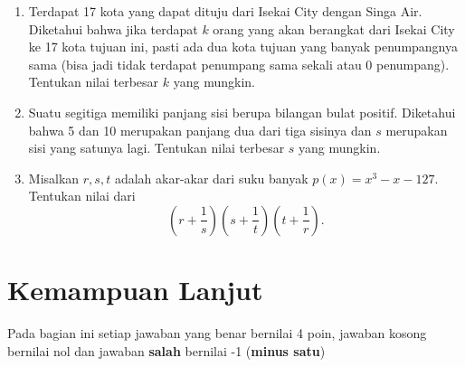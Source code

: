\documentclass[12pt]{scrartcl}
\begin{document}
\begin{enumerate}
		\item Terdapat 17 kota yang dapat dituju dari Isekai City dengan Singa Air. Diketahui bahwa jika terdapat $k$ orang yang akan berangkat dari Isekai City ke 17 kota tujuan ini, pasti ada dua kota tujuan yang banyak penumpangnya sama (bisa jadi tidak terdapat penumpang sama sekali atau 0 penumpang). Tentukan nilai terbesar $k$ yang mungkin.
		
		\item Suatu segitiga memiliki panjang sisi berupa bilangan bulat positif. Diketahui bahwa 5 dan 10 merupakan panjang dua dari tiga sisinya dan $s$ merupakan sisi yang satunya lagi. Tentukan nilai terbesar $s$ yang mungkin.
		
		\item Misalkan $r,s,t$ adalah akar-akar dari suku banyak $p(x)=x^3-x-127$. Tentukan nilai dari $$\left (r+\frac{1}{s} \right)\left(s+\frac{1}{t}\right)\left(t+\frac{1}{r}\right).$$  
	\end{enumerate}

\section{Kemampuan Lanjut}
Pada bagian ini setiap jawaban yang benar bernilai 4 poin, jawaban kosong bernilai nol
dan jawaban \textbf{salah} bernilai -1 (\textbf{minus satu})
\end{document}
